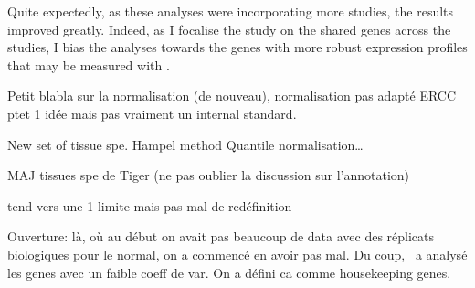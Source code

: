 Quite expectedly, as these analyses were incorporating more studies,
the results improved greatly.
Indeed, as I focalise the study on the shared genes across the studies,
I bias the analyses towards the genes with more robust expression profiles
that may be measured with \Rnaseq.



Petit blabla sur la normalisation (de nouveau), normalisation pas adapté
ERCC ptet 1 idée mais pas vraiment un internal standard.


New set of tissue spe.
Hampel method
Quantile normalisation\ldots

MAJ tissues spe de Tiger (ne pas oublier la discussion sur l'annotation)

tend vers une 1 limite mais pas mal de redéfinition


Ouverture: là, où au début on avait pas beaucoup de data avec des réplicats
biologiques pour le normal, on a commencé en avoir pas mal. Du coup, \nuno\
a analysé les genes avec un faible coeff de var. On a défini ca comme housekeeping
genes.







